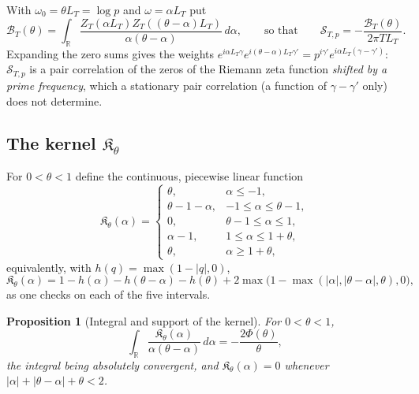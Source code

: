 \documentclass[preprint,12pt]{elsarticle}
\numberwithin{equation}{section}
\theoremstyle{plain}
\newtheorem{proposition}[theorem]{Proposition}
\theoremstyle{definition}
\theoremstyle{remark}
\newcommand{\R}{\mathbb R}
\begin{document}
With $\omega_0=\theta L_T=\log p$ and $\omega=\alpha L_T$ put
\begin{equation}
\mathcal B_T(\theta)=\int_\R\frac{Z_T(\alpha L_T)Z_T((\theta-\alpha)L_T)}{\alpha(\theta-\alpha)}\,d\alpha,\qquad\text{so that}\qquad \mathcal S_{T,p}=-\frac{\mathcal B_T(\theta)}{2\pi TL_T}.
\label{eq:BT_scaled}
\end{equation}
Expanding the zero sums gives the weights $e^{i\alpha L_T\gamma}e^{i(\theta-\alpha)L_T\gamma'}=p^{i\gamma'}e^{i\alpha L_T(\gamma-\gamma')}$: $\mathcal S_{T,p}$ is a pair correlation of the zeros of the Riemann zeta function \emph{shifted by a prime frequency}, which a stationary pair correlation (a function of $\gamma-\gamma'$ only) does not determine.

\subsection{The kernel $\mathfrak K_\theta$}
\label{subsec:kernel}
For $0<\theta<1$ define the continuous, piecewise linear function
\begin{equation}
\mathfrak K_\theta(\alpha)=
\begin{cases}
\theta,&\alpha\le-1,\\
\theta-1-\alpha,&-1\le\alpha\le\theta-1,\\
0,&\theta-1\le\alpha\le1,\\
\alpha-1,&1\le\alpha\le1+\theta,\\
\theta,&\alpha\ge1+\theta,
\end{cases}
\label{eq:kernel_piecewise}
\end{equation}
equivalently, with $h(q)=\max(1-|q|,0)$,
\begin{equation}
\mathfrak K_\theta(\alpha)=1-h(\alpha)-h(\theta-\alpha)-h(\theta)+2\max\bigl(1-\max(|\alpha|,|\theta-\alpha|,\theta),0\bigr),
\label{eq:kernel_intersections}
\end{equation}
as one checks on each of the five intervals.

\begin{proposition}[Integral and support of the kernel]\label{prop:kernel_integral}
For $0<\theta<1$,
\begin{equation}
\int_\R\frac{\mathfrak K_\theta(\alpha)}{\alpha(\theta-\alpha)}\,d\alpha=-\frac{2\Phi(\theta)}{\theta},
\label{eq:kernel_integral}
\end{equation}
the integral being absolutely convergent, and $\mathfrak K_\theta(\alpha)=0$ whenever $|\alpha|+|\theta-\alpha|+\theta<2$.
\end{proposition}
\end{document}
